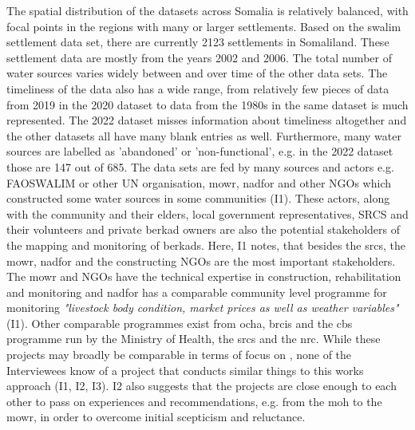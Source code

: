 The spatial distribution of the datasets across Somalia is relatively balanced, with focal points in the regions with many or larger settlements. Based on the \acrshort{swalim} settlement data set, there are currently 2123 settlements in Somaliland. These settlement data are mostly from the years 2002 and 2006. The total number of water sources varies widely between and over time of the other data sets. The timeliness of the data also has a wide range, from relatively few pieces of data from 2019 in the 2020 dataset to data from the 1980s in the same dataset is much represented. The 2022 dataset misses information about timeliness altogether and the other datasets all have many blank entries as well. Furthermore, many water sources are labelled as 'abandoned' or 'non-functional', e.g. in the 2022 dataset those are 147 out of 685.\newline
The data sets are fed by many sources and actors e.g. FAOSWALIM or other UN organisation, \acrshort*{mowr}, \acrshort*{nadfor} and other NGOs which constructed some water sources in some communities (I1). These actors, along with the community and their elders, local government representatives, SRCS and their volunteers and private berkad owners are also the potential stakeholders of the mapping and monitoring of berkads. Here, I1 notes, that besides the \acrshort*{srcs}, the \acrshort*{mowr}, \acrshort*{nadfor} and the constructing NGOs are the most important stakeholders. The \acrshort*{mowr} and NGOs have the technical expertise in construction, rehabilitation and monitoring and \acrshort*{nadfor} has a comparable community level programme for monitoring \textit{"livestock body condition, market prices as well as weather variables"} (I1).\newline
Other comparable programmes exist from \acrshort*{ocha}, \acrshort*{brcis} and the \acrshort*{cbs} programme run by the Ministry of Health, the \acrshort{srcs} and the \acrshort*{nrc}. While these projects may broadly be comparable in terms of focus on , none of the Interviewees know of a project that conducts similar things to this works approach (I1, I2, I3). I2 also suggests that the projects are close enough to each other to pass on experiences and recommendations, e.g. from the \acrshort{moh} to the \acrshort{mowr}, in order to overcome initial scepticism and reluctance.\newline
